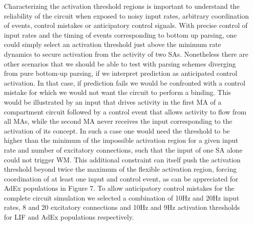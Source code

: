 \documentclass[10pt]{article}
\begin{document}
Characterizing the activation threshold regions is important to
understand the reliability of the circuit when exposed to noisy input
rates, arbitrary coordination of events, control mistakes or
anticipatory control signals. With precise control of input rates and
the timing of events corresponding to bottom up parsing, one could
simply select an activation threshold just above the minimum rate
dynamics to secure activation from the activity of two SAs. Nonetheless
there are other scenarios that we should be able to test with parsing
schemes diverging from pure bottom-up parsing, if we interpret
prediction as anticipated control activation. In that case, if
prediction fails we would be confronted with a control mistake for which
we would not want the circuit to perform a binding. This would be
illustrated by an input that drives activity in the first MA of a
compartment circuit followed by a control event that allows activity to
flow from all MAs, while the second MA never receives the input
corresponding to the activation of its concept. In such a case one would
need the threshold to be higher than the minimum of the impossible
activation region for a given input rate and number of excitatory
connections, such that the input of one SA alone could not trigger WM.
This additional constraint can itself push the activation threshold
beyond twice the maximum of the flexible activation region, forcing
coordination of at least one input and control event, as can be
appreciated for AdEx populations in Figure 7. To allow anticipatory
control mistakes for the complete circuit simulation we selected a
combination of 10Hz and 20Hz input rates, 8 and 20 excitatory
connections and 10Hz and 9Hz activation thresholds for LIF and AdEx
populations respectively.
\end{document}
